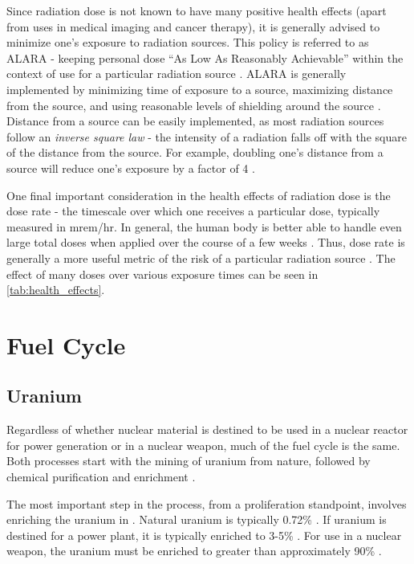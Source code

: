 \documentclass{report}
\begin{document}
Since radiation dose is not known to have many positive health effects (apart from uses in medical imaging and cancer therapy), it is generally advised to minimize one's exposure to radiation sources. This policy is referred to as ALARA - keeping personal dose \enquote{As Low As Reasonably Achievable} within the context of use for a particular radiation source \cite{Cember2008}. ALARA is generally implemented by minimizing time of exposure to a source, maximizing distance from the source, and using reasonable levels of shielding around the source \cite{Cherry2012}. Distance from a source can be easily implemented, as most radiation sources follow an \textit{inverse square law} - the intensity of a radiation falls off with the square of the distance from the source. For example, doubling one's distance from a source will reduce one's exposure by a factor of 4 \cite{Stabin2007}.

One final important consideration in the health effects of radiation dose is the dose rate - the timescale over which one receives a particular dose, typically measured in mrem/hr. In general, the human body is better able to handle even large total doses when applied over the course of a few weeks \cite{Stabin2007}. Thus, dose rate is generally a more useful metric of the risk of a particular radiation source \cite{Cherry2012}. The effect of many doses over various exposure times can be seen in \autoref{tab:health_effects}.





\chapter[Appendix C: Fuel Cycle]{Fuel Cycle}  \label{app:app_fuel_cycle}


\section{Uranium}

Regardless of whether nuclear material is destined to be used in a nuclear reactor for power generation or in a nuclear weapon, much of the fuel cycle is the same. Both processes start with the mining of uranium from nature, followed by chemical purification and enrichment \cite{Moody2014}.

The most important step in the process, from a proliferation standpoint, involves enriching the uranium in . Natural uranium is typically 0.72\%  \cite{Benedict1981}.  If uranium is destined for a power plant, it is typically enriched to  3-5\% . For use in a nuclear weapon, the uranium must be enriched to greater than approximately 90\%  \cite{Moody2014}. 
\end{document}
